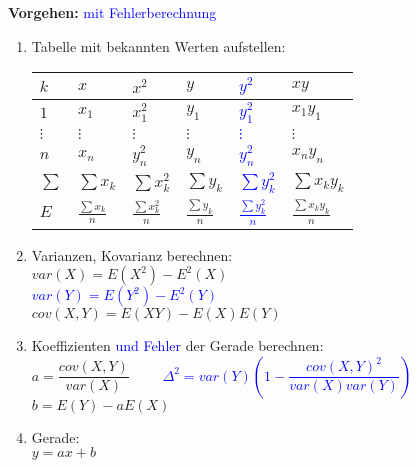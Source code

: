 \begin{minipage}[c]{10cm}
  \textbf{Vorgehen:}
  \textcolor{blue}{mit Fehlerberechnung}
	\begin{enumerate}
		\item Tabelle mit bekannten Werten aufstellen:\\
  		\begin{tabular}{|l||l|l||l|l||l|}
  		  \hline
        \textbf{$k$} & \textbf{$x$} & \textbf{$x^2$} & \textbf{$y$} &
  		  \textcolor{blue}{\textbf{$y^2$}} & \textbf{$xy$} \\
  		  \hline \hline
  		  $1$ & $x_1$ & $x_1^2$ & $y_1$ & \textcolor{blue}{$y_1^2$} & $x_1y_1$ \\
  		  \hline
  		  $\vdots$ & $\vdots$ & $\vdots$ & $\vdots$ & \textcolor{blue}{$\vdots$} &
  		  $\vdots$ \\\hline $n$ & $x_n$ & $y_n^2$ & $y_n$ & \textcolor{blue}{$y_n^2$} & $x_ny_n$ \\
  		  \hline
  		  \hline
  		  $\sum$ & $\sum x_k$ & $\sum x_k^2$ & $\sum y_k$ & \textcolor{blue}{$\sum
  		  y_k^2$} & $\sum x_ky_k$ \\
  		  \hline $E$ & $\frac{\sum x_k}{n}$ & $\frac{\sum x_k^2}{n}$ & $\frac{\sum
  		  y_k}{n}$ & \textcolor{blue}{$\frac{\sum y_k^2}{n}$} & $\frac{\sum x_ky_k}{n}$ \\
  		  \hline
  		\end{tabular} 
		\item Varianzen, Kovarianz berechnen: \\
		  $var(X) = E(X^2) - E^2(X)$ \\
		  \textcolor{blue}{$var(Y) = E(Y^2) - E^2(Y)$} \\
		  $cov(X,Y) = E(XY) - E(X)E(Y)$
		\item Koeffizienten \textcolor{blue}{und Fehler} der Gerade berechnen: \\
		  $a=\dfrac{cov(X,Y)}{var(X)}$
		  \textcolor{blue}{$\qquad\Delta^2=var(Y)\left(1-\dfrac{cov(X,Y)^2}
		  {var(X)var(Y)}\right) $} \\
		  $b=E(Y)-aE(X)$
		\item Gerade: \\
		$y=ax+b$
	\end{enumerate}
\end{minipage}
